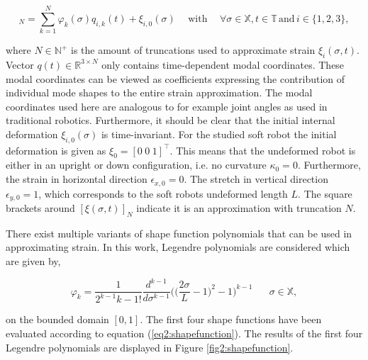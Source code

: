 \begin{equation}
    [\xi_i(\sigma,t)]_N = \sum_{k=1}^N \varphi_k(\sigma)q_{i,k}(t) + \xi_{i,0}(\sigma) \hspace{15pt} \text{with} \hspace{15pt} \forall \sigma \in \mathbb{X}, t \in \mathbb{T}  \hspace{2pt} \text{and} \hspace{2pt} i \in \{1,2,3\},
    \label{eq2:strainapprox}
\end{equation}

where $N \in \mathbb{N}^+$ is the amount of truncations used to approximate strain $\xi_i(\sigma,t)$. Vector $q(t) \in \mathbb{R}^{3 \times N}$ only contains time-dependent modal coordinates. These modal coordinates can be viewed as coefficients expressing the contribution of individual mode shapes to the entire strain approximation. The modal coordinates used here are analogous to for example joint angles as used in traditional robotics. Furthermore, it should be clear that the initial internal deformation $\xi_{i,0}(\sigma)$ is time-invariant. For the studied soft robot the initial deformation is given as $\xi_0 = [0 \hspace{3pt} 0 \hspace{3pt} 1]^\top$. This means that the undeformed robot is either in an upright or down configuration, i.e. no curvature $\kappa_0 = 0$. Furthermore, the strain in horizontal direction $\epsilon_{x,0} = 0$. The stretch in vertical direction $\epsilon_{y,0} = 1$, which corresponds to the soft robots undeformed length $L$. The square brackets around $[\xi(\sigma,t)]_N$ indicate it is an approximation with truncation $N$. 

There exist multiple variants of shape function polynomials that can be used in approximating strain. In this work, Legendre polynomials are considered which are given by,

\begin{equation}
    \varphi_{k} = \frac{1}{2^{k-1} k-1!} \frac{d^{k-1}}{d\sigma^{k-1}}\Big(\Big(\frac{2\sigma}{L}-1\Big)^2-1\Big)^{k-1} \hspace{20pt} \sigma \in \mathbb{X},
    \label{eq2:shapefunction}
\end{equation}

on the bounded domain $[0,1]$. The first four shape functions have been evaluated according to equation (\ref{eq2:shapefunction}). The results of the first four Legendre polynomials are displayed in Figure \ref{fig2:shapefunction}. 

